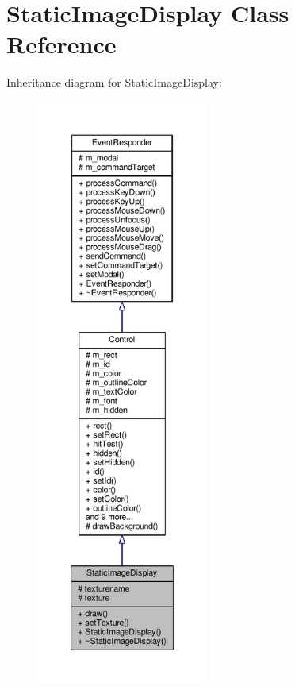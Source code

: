\hypertarget{classStaticImageDisplay}{}\section{Static\+Image\+Display Class Reference}
\label{classStaticImageDisplay}


Inheritance diagram for Static\+Image\+Display\+:
\nopagebreak
\begin{figure}[H]
\begin{center}
\leavevmode
\includegraphics[height=550pt]{d9/dad/classStaticImageDisplay__inherit__graph}
\end{center}
\end{figure}


